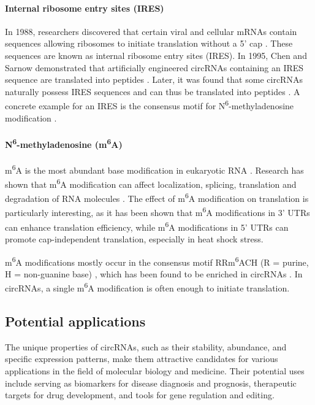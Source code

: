 \paragraph{Internal ribosome entry sites (IRES)}
In 1988, researchers discovered that certain viral and cellular mRNAs contain
sequences allowing ribosomes to initiate translation without a 5' cap
\supercite{pelletier_internal_1988, jang_segment_1988}. These sequences are
known as internal ribosome entry sites (IRES). In 1995, Chen and Sarnow
demonstrated that artificially engineered circRNAs containing an IRES sequence
are translated into peptides \supercite{chen_initiation_1995}. Later, it
was found that some circRNAs naturally possess IRES sequences and can thus be
translated into peptides
\supercite{chen_expanding_2020,legnini_circ-znf609_2017,pamudurti_translation_2017}.
A concrete example for an IRES is the consensus motif for
N\textsuperscript{6}-methyladenosine modification \supercite{yang_extensive_2017}.

\paragraph{N\textsuperscript{6}-methyladenosine (m\textsuperscript{6}A)}
m\textsuperscript{6}A is the most abundant base modification in eukaryotic RNA
\supercite{yang_extensive_2017,li_pivotal_2014,wei_methylated_1975}. Research
has shown that m\textsuperscript{6}A modification can affect localization,
splicing, translation and degradation of RNA molecules
\supercite{yue_rna_2015,meyer_dynamic_2014}. The effect of m\textsuperscript{6}A
modification on translation is particularly interesting, as it has been shown
that m\textsuperscript{6}A modifications in 3' UTRs can enhance translation
efficiency\supercite{wang_n6-methyladenosine_2015}, while m\textsuperscript{6}A
modifications in 5' UTRs can promote cap-independent translation, especially in
heat shock stress\supercite{zhou_dynamic_2015,meyer_5_2015}.

m\textsuperscript{6}A modifications mostly occur in the consensus motif
RRm\textsuperscript{6}ACH (R = purine, H = non-guanine base)
\supercite{csepany_sequence_1990,harper_sequence_1990}, which has been found to
be enriched in circRNAs \supercite{yang_extensive_2017}. In circRNAs, a single
m\textsuperscript{6}A modification is often enough to initiate
translation\supercite{yang_extensive_2017}.

\subsection{Potential applications}
The unique properties of circRNAs, such as their stability, abundance, and
specific expression patterns, make them attractive candidates for various
applications in the field of molecular biology and medicine. Their potential
uses include serving as biomarkers for disease diagnosis and prognosis,
therapeutic targets for drug development, and tools for gene regulation and
editing.

